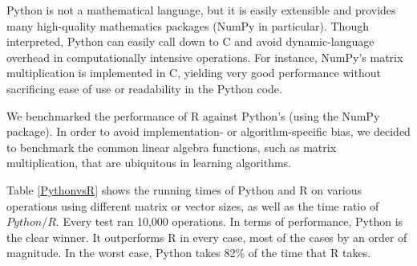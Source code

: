 \documentclass[%
  final,
  notitlepage,
  narroweqnarray,
  inline,
]{ieee}
\begin{document}
Python is not a mathematical language, but it is easily extensible and provides
many high-quality mathematics packages (NumPy in particular). Though
interpreted, Python can easily call down to C and avoid dynamic-language
overhead in computationally intensive operations. For instance, NumPy's matrix
multiplication is implemented in C, yielding very good performance
without sacrificing ease of use or readability in the Python code.

We benchmarked the performance of R against Python's (using the NumPy package).
In order to avoid implementation- or algorithm-specific bias, we decided to
benchmark the common linear algebra functions, such as matrix multiplication,
that are ubiquitous in learning algorithms.

Table \ref{PythonvsR} shows the running times of Python and R on various
operations using different matrix or vector sizes, as well as the time ratio of
$Python / R$. Every test ran 10,000 operations. In terms of performance, Python
is the clear winner. It outperforms R in every case, most of the cases by an
order of magnitude. In the worst case, Python takes 82\% of the time that R
takes.
\end{document}
